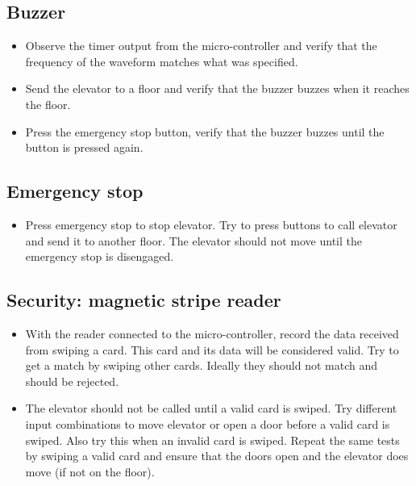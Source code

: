 \documentclass{article}
\begin{document}
	    \subsection{Buzzer}
	    \begin{itemize}
	        \item Observe the timer output from the micro-controller and verify that the frequency of the waveform matches what was specified.
	        \item Send the elevator to a floor and verify that the buzzer buzzes when it reaches the floor.
	        \item Press the emergency stop button, verify that the buzzer buzzes until the button is pressed again.
	    \end{itemize}
	    
	    \subsection{Emergency stop}
	    \begin{itemize}
	        \item Press emergency stop to stop elevator. Try to press buttons to call elevator and send it to another floor. The elevator should not move until the emergency stop is disengaged.
	    \end{itemize}
	    
	    \subsection{Security: magnetic stripe reader}
	    \begin{itemize}
	        \item With the reader connected to the micro-controller, record the data received from swiping a card. This card and its data will be considered valid. Try to get a match by swiping other cards. Ideally they should not match and should be rejected.
	        \item The elevator should not be called until a valid card is swiped. Try different input combinations to move elevator or open a door before a valid card is swiped. Also try this when an invalid card is swiped. Repeat the same tests by swiping a valid card and ensure that the doors open and the elevator does move (if not on the floor).
	    \end{itemize}
	    
\end{document}
